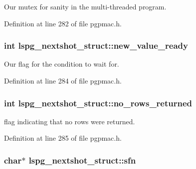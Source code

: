 Our mutex for sanity in the multi-\/threaded program. 



Definition at line 282 of file pgpmac.\-h.

\hypertarget{structlspg__nextshot__struct_adb8da14444b98f556dba9420dd4666dc}{
\subsubsection[{new\-\_\-value\-\_\-ready}]{\setlength{\rightskip}{0pt plus 5cm}int lspg\-\_\-nextshot\-\_\-struct\-::new\-\_\-value\-\_\-ready}}\label{structlspg__nextshot__struct_adb8da14444b98f556dba9420dd4666dc}


Our flag for the condition to wait for. 



Definition at line 284 of file pgpmac.\-h.

\hypertarget{structlspg__nextshot__struct_abc9242805729f70b83df79706c394c71}{
\subsubsection[{no\-\_\-rows\-\_\-returned}]{\setlength{\rightskip}{0pt plus 5cm}int lspg\-\_\-nextshot\-\_\-struct\-::no\-\_\-rows\-\_\-returned}}\label{structlspg__nextshot__struct_abc9242805729f70b83df79706c394c71}


flag indicating that no rows were returned. 



Definition at line 285 of file pgpmac.\-h.

\hypertarget{structlspg__nextshot__struct_a03252bba597b081edc9d08b20b558cc7}{
\subsubsection[{sfn}]{\setlength{\rightskip}{0pt plus 5cm}char$\ast$ lspg\-\_\-nextshot\-\_\-struct\-::sfn}}\label{structlspg__nextshot__struct_a03252bba597b081edc9d08b20b558cc7}



